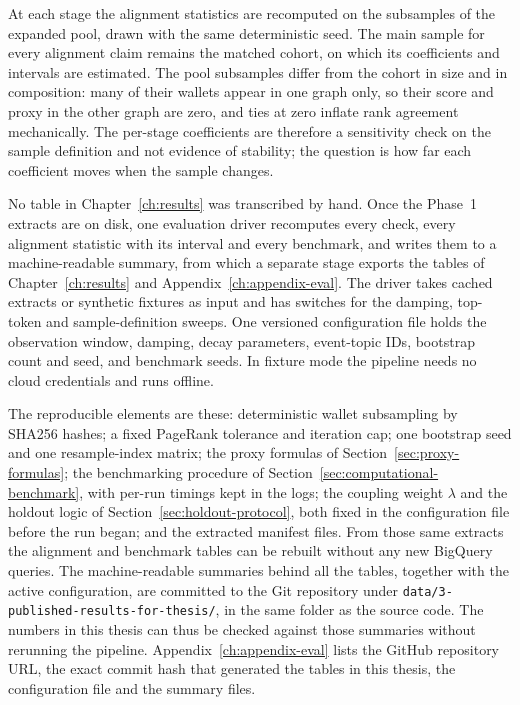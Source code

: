 
At each stage the alignment statistics are recomputed on the subsamples of the expanded pool, drawn with the same deterministic seed. The main sample for every alignment claim remains the matched cohort, on which its coefficients and intervals are estimated. The pool subsamples differ from the cohort in size and in composition: many of their wallets appear in one graph only, so their score and proxy in the other graph are zero, and ties at zero inflate rank agreement mechanically. The per-stage coefficients are therefore a sensitivity check on the sample definition and not evidence of stability; the question is how far each coefficient moves when the sample changes.


No table in Chapter~\ref{ch:results} was transcribed by hand. Once the Phase~1 extracts are on disk, one evaluation driver recomputes every check, every alignment statistic with its interval and every benchmark, and writes them to a machine-readable summary, from which a separate stage exports the tables of Chapter~\ref{ch:results} and Appendix~\ref{ch:appendix-eval}. The driver takes cached extracts or synthetic fixtures as input and has switches for the damping, top-token and sample-definition sweeps. One versioned configuration file holds the observation window, damping, decay parameters, event-topic IDs, bootstrap count and seed, and benchmark seeds. In fixture mode the pipeline needs no cloud credentials and runs offline.

The reproducible elements are these: deterministic wallet subsampling by SHA256 hashes; a fixed PageRank tolerance and iteration cap; one bootstrap seed and one resample-index matrix; the proxy formulas of Section~\ref{sec:proxy-formulas}; the benchmarking procedure of Section~\ref{sec:computational-benchmark}, with per-run timings kept in the logs; the coupling weight $\lambda$ and the holdout logic of Section~\ref{sec:holdout-protocol}, both fixed in the configuration file before the run began; and the extracted manifest files. From those same extracts the alignment and benchmark tables can be rebuilt without any new BigQuery queries. The machine-readable summaries behind all the tables, together with the active configuration, are committed to the Git repository under \texttt{data/3-published-results-for-thesis/}, in the same folder as the source code. The numbers in this thesis can thus be checked against those summaries without rerunning the pipeline. Appendix~\ref{ch:appendix-eval} lists the GitHub repository URL, the exact commit hash that generated the tables in this thesis, the configuration file and the summary files.

